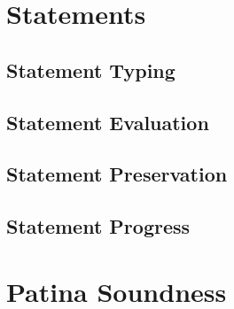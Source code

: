 \section*{Statements}
\subsection*{Statement Typing}
\subsection*{Statement Evaluation}
\subsection*{Statement Preservation}
\subsection*{Statement Progress}
\section*{Patina Soundness}
